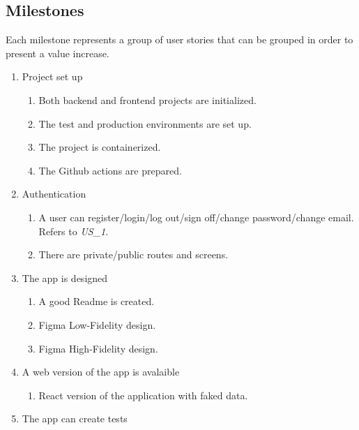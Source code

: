 \subsection{Milestones}
Each milestone represents a group of user stories that can be grouped in order to present a value increase.

\begin{enumerate}[label=\textbf{MIL\_\arabic*}, align=left, leftmargin=*]
    \item Project set up
        \begin{enumerate}[label=\textbf{\theenumi.\arabic*}, align=left, leftmargin=*]
            \item Both backend and frontend projects are initialized.
            \item The test and production environments are set up.
            \item The project is containerized.
            \item The Github actions are prepared.
        \end{enumerate}
    \item Authentication
        \begin{enumerate}[label=\textbf{\theenumi.\arabic*}, align=left, leftmargin=*]
            \item A user can register/login/log out/sign off/change password/change email. Refers to \textit{US\_1}.
            \item There are private/public routes and screens.
        \end{enumerate}
    \item The app is designed
        \begin{enumerate}[label=\textbf{\theenumi.\arabic*}, align=left, leftmargin=*]
            \item A good Readme is created.
            \item Figma \cite{Figma} Low-Fidelity design.
            \item Figma \cite{Figma} High-Fidelity design.
        \end{enumerate}
    \item A web version of the app is avalaible
        \begin{enumerate}[label=\textbf{\theenumi.\arabic*}, align=left, leftmargin=*]
            \item React version of the application with faked data.
        \end{enumerate}
    \item The app can create tests

\end{enumerate}
